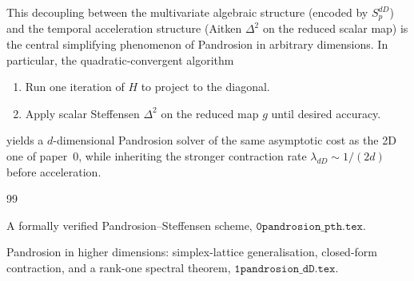 \documentclass[11pt,a4paper]{article}
\theoremstyle{definition}
\theoremstyle{remark}
\begin{document}
This decoupling between the multivariate algebraic structure (encoded
by $S_p^{dD}$) and the temporal acceleration structure (Aitken
$\Delta^2$ on the reduced scalar map) is the central simplifying
phenomenon of Pandrosion in arbitrary dimensions.  In particular, the
quadratic-convergent algorithm
\begin{enumerate}
\item Run one iteration of $H$ to project to the diagonal.
\item Apply scalar Steffensen $\Delta^2$ on the reduced map $g$ until
  desired accuracy.
\end{enumerate}
yields a $d$-dimensional Pandrosion solver of the same asymptotic cost
as the 2D one of paper~0, while inheriting the stronger contraction rate
$\lambda_{dD} \sim 1/(2d)$ before acceleration.

\begin{thebibliography}{99}

A formally verified Pandrosion--Steffensen scheme,
$\texttt{0pandrosion\_pth.tex}$.

Pandrosion in higher dimensions: simplex-lattice generalisation,
closed-form contraction, and a rank-one spectral theorem,
$\texttt{1pandrosion\_dD.tex}$.

\end{thebibliography}
\end{document}
